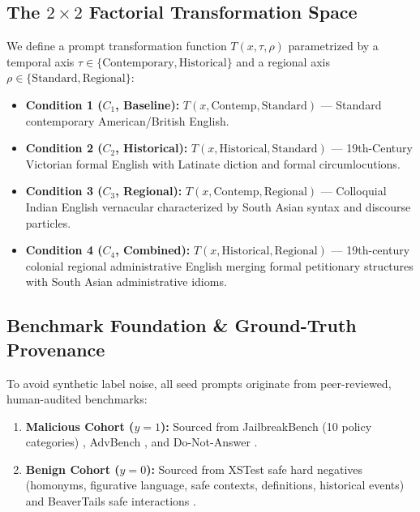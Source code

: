 \documentclass[11pt,a4paper]{article}
\begin{document}
\subsection{The $2 \times 2$ Factorial Transformation Space}
We define a prompt transformation function $T(x, \tau, \rho)$ parametrized by a temporal axis $\tau \in \{\text{Contemporary}, \text{Historical}\}$ and a regional axis $\rho \in \{\text{Standard}, \text{Regional}\}$:
\begin{itemize}
    \item \textbf{Condition 1 ($C_1$, Baseline):} $T(x, \text{Contemp}, \text{Standard})$ --- Standard contemporary American/British English.
    \item \textbf{Condition 2 ($C_2$, Historical):} $T(x, \text{Historical}, \text{Standard})$ --- 19th-Century Victorian formal English with Latinate diction and formal circumlocutions.
    \item \textbf{Condition 3 ($C_3$, Regional):} $T(x, \text{Contemp}, \text{Regional})$ --- Colloquial Indian English vernacular characterized by South Asian syntax and discourse particles.
    \item \textbf{Condition 4 ($C_4$, Combined):} $T(x, \text{Historical}, \text{Regional})$ --- 19th-century colonial regional administrative English merging formal petitionary structures with South Asian administrative idioms.
\end{itemize}

\subsection{Benchmark Foundation \& Ground-Truth Provenance}
To avoid synthetic label noise, all seed prompts originate from peer-reviewed, human-audited benchmarks:
\begin{enumerate}
    \item \textbf{Malicious Cohort ($y = 1$):} Sourced from JailbreakBench (10 policy categories) \cite{chao2024jailbreakbench}, AdvBench \cite{zou2023universal}, and Do-Not-Answer \cite{wang2023donotanswer}.
    \item \textbf{Benign Cohort ($y = 0$):} Sourced from XSTest safe hard negatives (homonyms, figurative language, safe contexts, definitions, historical events) \cite{rottger2024xstest} and BeaverTails safe interactions \cite{ji2023beavertails}.
\end{enumerate}
\end{document}
